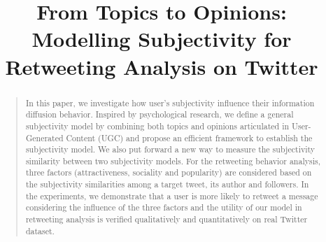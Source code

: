 \documentclass[letterpaper]{article}
\begin{document}
%
\title{From Topics to Opinions: \\Modelling Subjectivity for Retweeting Analysis on Twitter}
\nocopyright
\maketitle
\begin{abstract}
\begin{quote}
In this paper, we investigate how user's subjectivity influence their information diffusion behavior. 
Inspired by psychological research, we define a general subjectivity model by combining both topics and opinions articulated in User-Generated Content (UGC) and propose an efficient framework to establish the subjectivity model. 
We also put forward a new way to measure the subjectivity similarity between two subjectivity models. For the retweeting behavior analysis, three factors (attractiveness, sociality and popularity) are considered based on the subjectivity similarities among a target tweet, its author and followers. In the experiments, we demonstrate that a user is more likely to retweet a message considering the influence of the three factors and the utility of our model in retweeting analysis is verified qualitatively and quantitatively on real Twitter dataset.
\end{quote}
\end{abstract}
\end{document}
